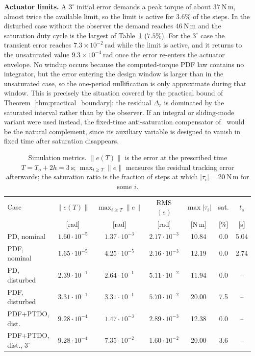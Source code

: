 \textbf{Actuator limits.} A $3^\circ$ initial error demands a peak torque of about $37~\mathrm{N\,m}$, almost twice the available limit, so the limit is active for $3.6\%$ of the steps. In the disturbed case without the observer the demand reaches $46~\mathrm{N\,m}$ and the saturation duty cycle is the largest of Table~\ref{tab:sim_metrics} ($7.5\%$). For the $3^\circ$ case the transient error reaches $7.3\times10^{-2}~\mathrm{rad}$ while the limit is active, and it returns to the unsaturated value $9.3\times10^{-4}~\mathrm{rad}$ once the error re-enters the actuator envelope. No windup occurs because the computed-torque PDF law contains no integrator, but the error entering the design window is larger than in the unsaturated case, so the one-period nullification is only approximate during that window. This is precisely the situation covered by the practical bound of Theorem~\ref{thm:practical_boundary}: the residual $\Delta_r$ is dominated by the saturated interval rather than by the observer. If an integral or sliding-mode variant were used instead, the fixed-time anti-saturation compensator of~\cite{dou2025fractional} would be the natural complement, since its auxiliary variable is designed to vanish in fixed time after saturation disappears.

\begin{table}[t]
\centering
\caption{Simulation metrics. $\|e(T)\|$ is the error at the prescribed time $T=T_o+2h=3~\mathrm{s}$; $\max_{t\ge T}\|e\|$ measures the residual tracking error afterwards; the saturation ratio is the fraction of steps at which $|\tau_i|=20~\mathrm{N\,m}$ for some $i$.}
\label{tab:sim_metrics}
\scriptsize
\setlength{\tabcolsep}{1pt}
\begin{tabular}{lcccccc}
\toprule
Case & $\|e(T)\|$ & $\max_{t\ge T}\|e\|$ & RMS$(e)$ & $\max|\tau_i|$ & sat. & $t_s$\\
     & [rad] & [rad] & [rad] & [N\,m] & [\%] & [s]\\
\midrule
PD, nominal          & $1.60\cdot10^{-5}$ & $1.37\cdot10^{-3}$ & $2.17\cdot10^{-3}$ & 10.84 & 0.0 & 5.04\\
PDF, nominal         & $1.65\cdot10^{-5}$ & $4.25\cdot10^{-5}$ & $2.16\cdot10^{-3}$ & 12.19 & 0.0 & 2.74\\
PD, disturbed        & $2.39\cdot10^{-1}$ & $2.64\cdot10^{-1}$ & $5.11\cdot10^{-2}$ & 11.94 & 0.0 & --\\
PDF, disturbed       & $3.31\cdot10^{-1}$ & $3.31\cdot10^{-1}$ & $5.70\cdot10^{-2}$ & 20.00 & 7.5 & --\\
PDF+PTDO, dist.      & $9.28\cdot10^{-4}$ & $1.47\cdot10^{-3}$ & $2.89\cdot10^{-3}$ & 12.38 & 0.0 & --\\
PDF+PTDO, dist., $3^\circ$ & $9.28\cdot10^{-4}$ & $7.35\cdot10^{-2}$ & $1.60\cdot10^{-2}$ & 20.00 & 3.6 & --\\
\bottomrule
\end{tabular}
\end{table}

